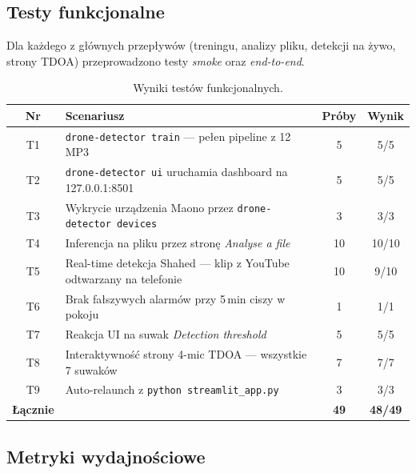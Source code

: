 \documentclass[11pt,a4paper]{article}
\begin{document}
\subsection{Testy funkcjonalne}

Dla każdego z głównych przepływów (treningu, analizy pliku, detekcji na żywo,
strony TDOA) przeprowadzono testy \emph{smoke} oraz \emph{end-to-end}.

\begin{table}[H]
\centering
\caption{Wyniki testów funkcjonalnych.}
\label{tab:tests_func}
\begin{tabularx}{\linewidth}{cXcc}
\toprule
\textbf{Nr} & \textbf{Scenariusz} & \textbf{Próby} & \textbf{Wynik} \\
\midrule
T1 & \texttt{drone-detector train} --- pełen pipeline z 12 MP3            & 5  & 5/5 \\
T2 & \texttt{drone-detector ui} uruchamia dashboard na 127.0.0.1:8501     & 5  & 5/5 \\
T3 & Wykrycie urządzenia Maono przez \texttt{drone-detector devices}      & 3  & 3/3 \\
T4 & Inferencja na pliku przez stronę \emph{Analyse a file}               & 10 & 10/10 \\
T5 & Real-time detekcja Shahed --- klip z YouTube odtwarzany na telefonie & 10 & 9/10 \\
T6 & Brak fałszywych alarmów przy 5\,min ciszy w pokoju                   & 1  & 1/1 \\
T7 & Reakcja UI na suwak \emph{Detection threshold}                       & 5  & 5/5 \\
T8 & Interaktywność strony 4-mic TDOA --- wszystkie 7 suwaków             & 7  & 7/7 \\
T9 & Auto-relaunch z \texttt{python streamlit\_app.py}                    & 3  & 3/3 \\
\midrule
\textbf{Łącznie} & & \textbf{49} & \textbf{48/49} \\
\bottomrule
\end{tabularx}
\end{table}

\subsection{Metryki wydajnościowe}
\end{document}

